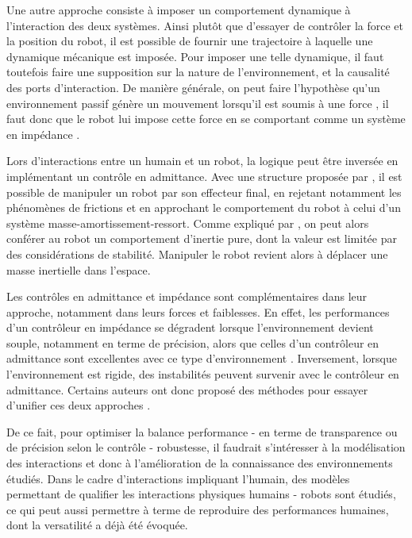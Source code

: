 Une autre approche consiste à imposer un comportement dynamique à l'interaction des deux systèmes. Ainsi plutôt que d'essayer de contrôler la force et la position du robot, il est possible de fournir une trajectoire à laquelle une dynamique mécanique est imposée. Pour imposer une telle dynamique, il faut toutefois faire une supposition sur la nature de l'environnement, et la causalité des ports d'interaction. De manière générale, on peut faire l'hypothèse qu'un environnement passif génère un mouvement lorsqu'il est soumis à une force \parencite{hogan_impedance_1985}, il faut donc que le robot lui impose cette force en se comportant comme un système en impédance \parencite{hogan_impedance_1985b}. %



Lors d'interactions entre un humain et un robot, la logique peut être inversée en implémentant un contrôle en admittance. Avec une structure proposée par \parencite{newman_stability_1992}, il est possible de manipuler un robot par son effecteur final, en rejetant notamment les phénomènes de frictions et en approchant le comportement du robot à celui d'un système masse-amortissement-ressort. Comme expliqué par \textcite[Chapitre~3]{lamy_conception_2011}, on peut alors conférer au robot un comportement d'inertie pure, dont la valeur est limitée par des considérations de stabilité. Manipuler le robot revient alors à déplacer une masse inertielle dans l'espace.

%
\tikzexternaldisable

Les contrôles en admittance et impédance sont complémentaires dans leur approche, notamment dans leurs forces et faiblesses. En effet, les performances d'un contrôleur en impédance se dégradent lorsque l'environnement devient souple, notamment en terme de précision, alors que celles d'un contrôleur en admittance sont excellentes avec ce type d'environnement \parencite{valency_accuracyrobustness_2003}. Inversement, lorsque l'environnement est rigide, des instabilités peuvent survenir avec le contrôleur en admittance. Certains auteurs ont donc proposé des méthodes pour essayer d'unifier ces deux approches \parencite{ott_unified_2010}.

De ce fait, pour optimiser la balance performance - en terme de transparence ou de précision selon le contrôle - robustesse, il faudrait s'intéresser à la modélisation des interactions et donc à l'amélioration de la connaissance des environnements étudiés. Dans le cadre d'interactions impliquant l'humain, des modèles permettant de qualifier les interactions physiques humains - robots sont étudiés, ce qui peut aussi permettre à terme de reproduire des performances humaines, dont la versatilité a déjà été évoquée. 

